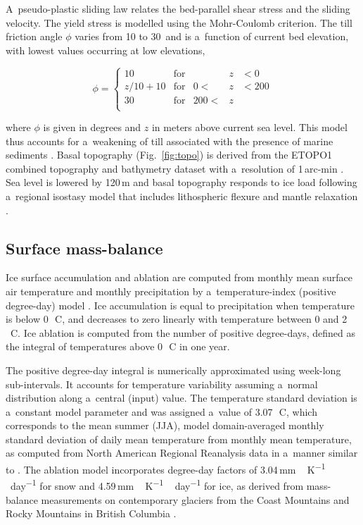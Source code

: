 \documentclass[tc, ms]{copernicus}
\begin{document}
A~pseudo-plastic sliding law \citep{aschwanden-etal-2013} relates the bed-parallel shear stress and the sliding velocity. The yield stress is modelled using the Mohr-Coulomb criterion. The till friction angle $\phi$ varies from 10 to 30\degree\ and is a~function of current bed elevation, with lowest values occurring at low elevations,

\begin{equation}
	\phi = \left\{\begin{array}{llrll}
		10      & \mathrm{for} &      &z&<  0 \\
		z/10+10 & \mathrm{for} &   0 <&z&<200 \\
		30      & \mathrm{for} & 200 <&z&     \\
	\end{array}\right.
\end{equation}

where $\phi$ is given in degrees and $z$ in meters above current sea level. This model thus accounts for a~weakening of till associated with the presence of marine sediments \citep{martin-etal-2011,aschwanden-etal-2013}. Basal topography (Fig.~\ref{fig:topo}) is derived from the ETOPO1 combined topography and bathymetry dataset with a~resolution of 1\,arc-min \citep{data:etopo1}. Sea level is lowered by 120\,m and basal topography responds to ice load following a~regional isostasy model that includes lithospheric flexure and mantle relaxation \citep{lingle-clark-1985}.

\subsection{Surface mass-balance}

Ice surface accumulation and ablation are computed from monthly mean surface air temperature and monthly precipitation by a~temperature-index (positive degree-day) model \citep{hock-2003}. Ice accumulation is equal to precipitation when temperature is below 0\,\unit{{\degree}C}, and decreases to zero linearly with temperature between 0 and 2\,\unit{{\degree}C}. Ice ablation is computed from the number of positive degree-days, defined as the integral of temperatures above 0\,\unit{{\degree}C} in one year. 

The positive degree-day integral \citep{calov-greve-2005} is numerically approximated using week-long sub-intervals. It accounts for temperature variability assuming a~normal distribution along a~central (input) value. The temperature standard deviation is a~constant model parameter and was assigned a~value of 3.07\,\unit{{\degree}C}, which corresponds to the mean summer (JJA), model domain-averaged monthly standard deviation of daily mean temperature from monthly mean temperature, as computed from North American Regional Reanalysis data \citep{data:narr} in a~manner similar to \citet{seguinot-2013}. The ablation model incorporates degree-day factors of 3.04\,\unit{mm\,K^{-1}\,day^{-1}} for snow and 4.59\,\unit{mm\,K^{-1}\,day^{-1}} for ice, as derived from mass-balance measurements on contemporary glaciers from the Coast Mountains and Rocky Mountains in British Columbia \citep{shea-etal-2009}.
\end{document}

